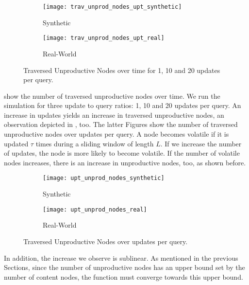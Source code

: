 \documentclass[abstracton,12pt]{scrartcl}
\theoremstyle{definition}
\begin{document}
\begin{figure}[h]
  \centering
  \begin{subfigure}{0.49\linewidth}
    \centering
    \caption{Synthetic}
    \texttt{[image: trav\_unprod\_nodes\_upt\_synthetic]}
    \label{fig:trav_unprod_nodes_upt_synthetic}
  \end{subfigure}
  \begin{subfigure}{0.49\linewidth}
    \centering
    \caption{Real-World}
    \texttt{[image: trav\_unprod\_nodes\_upt\_real]}
    \label{fig:trav_unprod_nodes_upt_real}
  \end{subfigure}
  \vspace{-0.5cm}
  \caption{Traversed Unproductive Nodes over time for 1, 10 and 20 updates per query.}
\end{figure}


 show
the number of traversed unproductive nodes over time. We run the simulation for
three update to query ratios: 1, 10 and 20 updates per query. An increase
in updates yields an increase in traversed unproductive nodes, an observation
depicted in , too.
The latter Figures show the number of traversed unproductive nodes over updates
per query.
A node becomes volatile if it is updated $\tau$ times during a sliding window of length $L$.
If we increase the number of updates, the node is more likely to become volatile.
If the number of volatile nodes increases, there is an increase in unproductive nodes, too,
as shown before.

\begin{figure}[h]
  \centering
  \begin{subfigure}{0.49\linewidth}
    \centering
    \caption{Synthetic}
    \texttt{[image: upt\_unprod\_nodes\_synthetic]}
    \label{fig:upt_unprod_nodes_synthetic}
  \end{subfigure}
  \begin{subfigure}{0.49\linewidth}
    \centering
    \caption{Real-World}
    \texttt{[image: upt\_unprod\_nodes\_real]}
    \label{fig:upt_unprod_nodes_real}
  \end{subfigure}
  \vspace{-0.5cm}
  \caption{Traversed Unproductive Nodes over updates per query.}
\end{figure}

In addition, the increase we observe is sublinear. As mentioned in the previous Sections,
since the number of unproductive nodes has an upper bound set by the number
of content nodes, the function must converge towards this upper bound.
\end{document}

